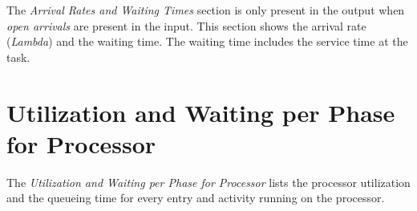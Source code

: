 The \emph{Arrival Rates and Waiting Times} section is only present in
the output when \emph{open arrivals} are present in the input.  This
section shows the arrival rate (\emph{Lambda}) and the
waiting time.  The waiting time includes the
service time at the task.

\section{Utilization and Waiting per Phase for Processor}
\label{sec:processor-wait-utilization-out}

The \emph{Utilization and Waiting per Phase for Processor} lists the
processor utilization and the queueing time for every entry and
activity running on the processor.


